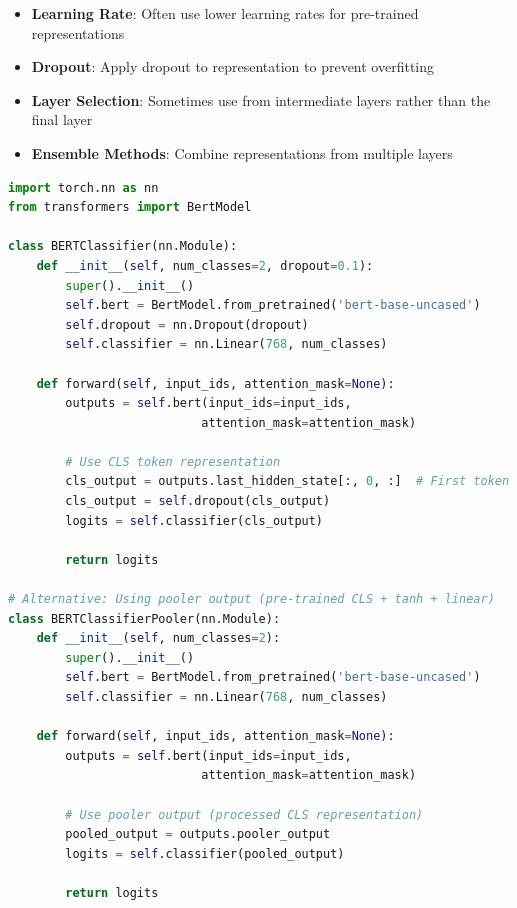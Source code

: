\begin{itemize}
\item \textbf{Learning Rate}: Often use lower learning rates for pre-trained \cls{} representations
\item \textbf{Dropout}: Apply dropout to \cls{} representation to prevent overfitting
\item \textbf{Layer Selection}: Sometimes use \cls{} from intermediate layers rather than the final layer
\item \textbf{Ensemble Methods}: Combine \cls{} representations from multiple layers
\end{itemize}

\begin{lstlisting}[language=Python, caption=Fine-tuning CLS Token]
import torch.nn as nn
from transformers import BertModel

class BERTClassifier(nn.Module):
    def __init__(self, num_classes=2, dropout=0.1):
        super().__init__()
        self.bert = BertModel.from_pretrained('bert-base-uncased')
        self.dropout = nn.Dropout(dropout)
        self.classifier = nn.Linear(768, num_classes)
        
    def forward(self, input_ids, attention_mask=None):
        outputs = self.bert(input_ids=input_ids, 
                           attention_mask=attention_mask)
        
        # Use CLS token representation
        cls_output = outputs.last_hidden_state[:, 0, :]  # First token
        cls_output = self.dropout(cls_output)
        logits = self.classifier(cls_output)
        
        return logits

# Alternative: Using pooler output (pre-trained CLS + tanh + linear)
class BERTClassifierPooler(nn.Module):
    def __init__(self, num_classes=2):
        super().__init__()
        self.bert = BertModel.from_pretrained('bert-base-uncased')
        self.classifier = nn.Linear(768, num_classes)
        
    def forward(self, input_ids, attention_mask=None):
        outputs = self.bert(input_ids=input_ids, 
                           attention_mask=attention_mask)
        
        # Use pooler output (processed CLS representation)
        pooled_output = outputs.pooler_output
        logits = self.classifier(pooled_output)
        
        return logits
\end{lstlisting}

